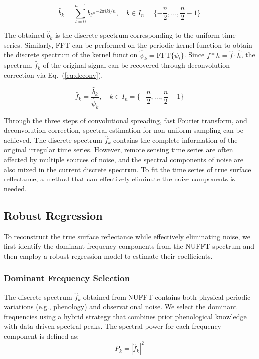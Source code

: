 \documentclass[letterpaper,journal]{IEEEtran}
\begin{document}
\begin{equation}
\label{eq:fft}
\hat{b}_k = \sum_{l=0}^{n-1} b_l e^{-2\pi i k l / n}, \quad k \in I_n = \{-\frac{n}{2}, ..., \frac{n}{2}-1\}
\end{equation}

The obtained $\hat{b}_k$ is the discrete spectrum corresponding to the uniform time series. Similarly, FFT can be performed on the periodic kernel function to obtain the discrete spectrum of the kernel function $\hat{\psi}_k = \text{FFT}\{\psi_l\}$. Since $f * h = \hat{f} \cdot \hat{h}$, the spectrum $\hat{f}_k$ of the original signal can be recovered through deconvolution correction via Eq.~(\ref{eq:deconv}).

\begin{equation}
\label{eq:deconv}
\hat{f}_k = \frac{\hat{b}_k}{\hat{\psi}_k}, \quad k \in I_n = \{-\frac{n}{2}, ..., \frac{n}{2}-1\}
\end{equation}

Through the three steps of convolutional spreading, fast Fourier transform, and deconvolution correction, spectral estimation for non-uniform sampling can be achieved. The discrete spectrum $\hat{f}_k$ contains the complete information of the original irregular time series. However, remote sensing time series are often affected by multiple sources of noise, and the spectral components of noise are also mixed in the current discrete spectrum. To fit the time series of true surface reflectance, a method that can effectively eliminate the noise components is needed.

\subsection{Robust Regression}

To reconstruct the true surface reflectance while effectively eliminating noise, we first identify the dominant frequency components from the NUFFT spectrum and then employ a robust regression model to estimate their coefficients.

\subsubsection{Dominant Frequency Selection}
The discrete spectrum $\hat{f}_k$ obtained from NUFFT contains both physical periodic variations (e.g., phenology) and observational noise. We select the dominant frequencies using a hybrid strategy that combines prior phenological knowledge with data-driven spectral peaks. The spectral power for each frequency component is defined as:
\begin{equation}
\label{eq:power}
P_k = \left|\hat{f}_k\right|^2
\end{equation}
\end{document}
